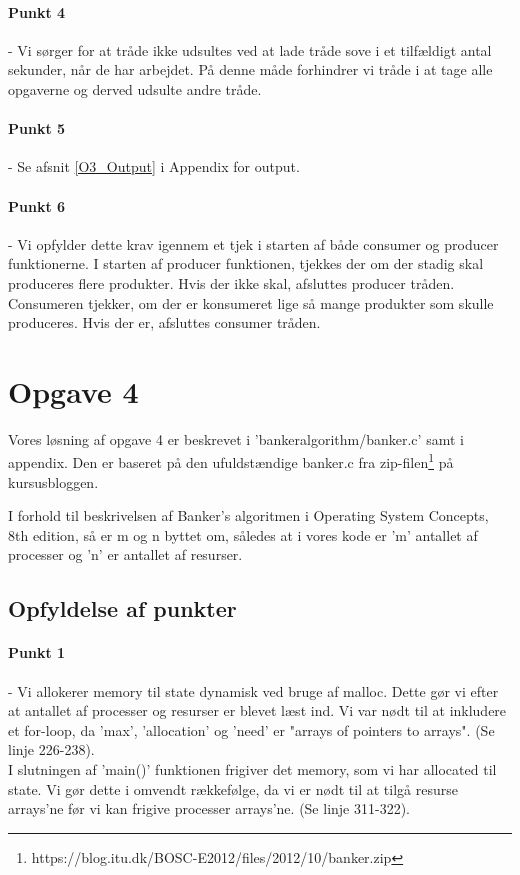 \paragraph{Punkt 4} - Vi sørger for at tråde ikke udsultes ved at lade tråde sove i et tilfældigt antal sekunder, når de har arbejdet. På denne måde forhindrer vi tråde i at tage alle opgaverne og derved udsulte andre tråde.
\paragraph{Punkt 5} - Se afsnit \ref{O3_Output} i Appendix for output.
\paragraph{Punkt 6} - Vi opfylder dette krav igennem et tjek i starten af både consumer og producer funktionerne. I starten af producer funktionen, tjekkes der om der stadig skal produceres flere produkter. Hvis der ikke skal, afsluttes producer tråden. Consumeren tjekker, om der er konsumeret lige så mange produkter som skulle produceres. Hvis der er, afsluttes consumer tråden.
\section{Opgave 4}
\label{O4}
Vores løsning af opgave 4 er beskrevet i 'bankeralgorithm/banker.c' samt i appendix. Den er baseret på den ufuldstændige banker.c fra zip-filen\footnote{https://blog.itu.dk/BOSC-E2012/files/2012/10/banker.zip} på kursusbloggen.

I forhold til beskrivelsen af Banker's algoritmen i Operating System Concepts, 8th edition, så er m og n byttet om, således at i vores kode er 'm' antallet af processer og 'n' er antallet af resurser.

\subsection{Opfyldelse af punkter}
\label{O4_Punkter}
\paragraph{Punkt 1} - Vi allokerer memory til state dynamisk ved bruge af malloc. Dette gør vi efter at antallet af processer og resurser er blevet læst ind. Vi var nødt til at inkludere et for-loop, da 'max', 'allocation' og 'need' er "arrays of pointers to arrays".  (Se linje 226-238).
\\I slutningen af 'main()' funktionen frigiver det memory, som vi har allocated til state. Vi gør dette i omvendt rækkefølge, da vi er nødt til at tilgå resurse arrays'ne før vi kan frigive processer arrays'ne. (Se linje 311-322).

